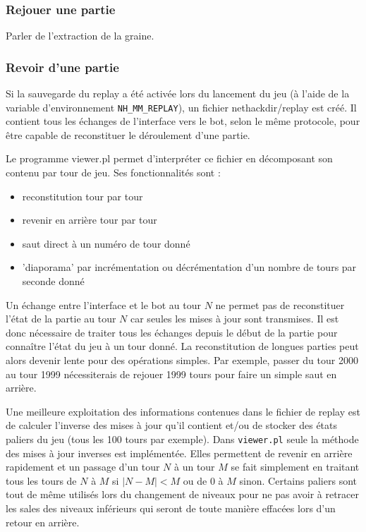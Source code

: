 \documentclass[a4paper,11pt]{article}
\begin{document}
\subsubsection{Rejouer une partie}

Parler de l'extraction de la graine.

\subsubsection{Revoir d'une partie}

	Si la sauvegarde du replay a été activée lors du lancement du jeu (à l'aide de la variable d'environnement \verb!NH_MM_REPLAY!), un fichier nethackdir/replay est créé. Il contient tous les échanges de l'interface vers le bot, selon le même protocole, pour être capable de reconstituer le déroulement d'une partie.

Le programme viewer.pl permet d'interpréter ce fichier en décomposant son contenu par tour de jeu. Ses fonctionnalités sont :
\begin{itemize}
	\item reconstitution tour par tour
	\item revenir en arrière tour par tour
	\item saut direct à un numéro de tour donné
	\item 'diaporama' par incrémentation ou décrémentation d'un nombre de tours par seconde donné
\end{itemize}

Un échange entre l'interface et le bot au tour $N$ ne permet pas de reconstituer l'état de la partie au tour $N$ car seules les mises à jour sont transmises. Il est donc nécessaire de traiter tous les échanges depuis le début de la partie pour connaître l'état du jeu à un tour donné. La reconstitution de longues parties peut alors devenir lente pour des opérations simples. Par exemple, passer du tour 2000 au tour 1999 nécessiterais de rejouer 1999 tours pour faire un simple saut en arrière.

Une meilleure exploitation des informations contenues dans le fichier de replay est de calculer l'inverse des mises à jour qu'il contient et/ou de stocker des états paliers du jeu (tous les 100 tours par exemple). Dans \verb!viewer.pl! seule la méthode des mises à jour inverses est implémentée. Elles permettent de revenir en arrière rapidement et un passage d'un tour $N$ à un tour $M$ se fait simplement en traitant tous les tours de $N$ à $M$ si $|N-M| < M$ ou de $0$ à $M$ sinon. Certains paliers sont tout de même utilisés lors du changement de niveaux pour ne pas avoir à retracer les sales des niveaux inférieurs qui seront de toute manière effacées lors d'un retour en arrière.
\end{document}
